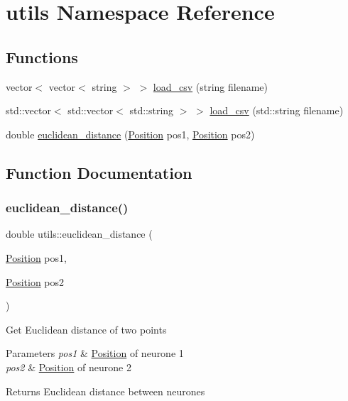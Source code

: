 \hypertarget{namespaceutils}{}\section{utils Namespace Reference}
\label{namespaceutils}
\subsection*{Functions}
\begin{DoxyCompactItemize}
\item 
vector$<$ vector$<$ string $>$ $>$ \mbox{\hyperlink{namespaceutils_a7598f55c583cffb9ba13f179808537fa}{load\+\_\+csv}} (string filename)
\item 
std\+::vector$<$ std\+::vector$<$ std\+::string $>$ $>$ \mbox{\hyperlink{namespaceutils_a5c44fc482aedf83775742090d60858f6}{load\+\_\+csv}} (std\+::string filename)
\item 
double \mbox{\hyperlink{namespaceutils_aacc30c431e23241f540bdcf1a1b8d140}{euclidean\+\_\+distance}} (\mbox{\hyperlink{struct_position}{Position}} pos1, \mbox{\hyperlink{struct_position}{Position}} pos2)
\end{DoxyCompactItemize}


\subsection{Function Documentation}
\mbox{\label{namespaceutils_aacc30c431e23241f540bdcf1a1b8d140}} 
\subsubsection{\texorpdfstring{euclidean\+\_\+distance()}{euclidean\_distance()}}
{\footnotesize\ttfamily double utils\+::euclidean\+\_\+distance (\begin{DoxyParamCaption}\item[{\mbox{\hyperlink{struct_position}{Position}}}]{pos1,  }\item[{\mbox{\hyperlink{struct_position}{Position}}}]{pos2 }\end{DoxyParamCaption})}

Get Euclidean distance of two points 
\begin{DoxyParams}{Parameters}
{\em pos1} & \mbox{\hyperlink{struct_position}{Position}} of neurone 1 \\
\hline
{\em pos2} & \mbox{\hyperlink{struct_position}{Position}} of neurone 2 \\
\hline
\end{DoxyParams}
\begin{DoxyReturn}{Returns}
Euclidean distance between neurones 
\end{DoxyReturn}
\mbox{\label{namespaceutils_a7598f55c583cffb9ba13f179808537fa}} 
